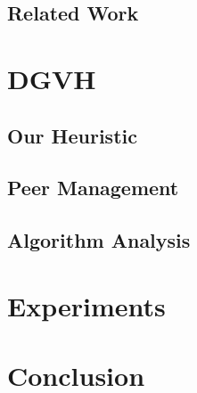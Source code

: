 \documentclass[8pt]{beamer}
\begin{document}
	
	
	\subsection{Related Work}
	
	\section{DGVH}
	
	\subsection{Our Heuristic}
	
	\subsection{Peer Management}
	
	
	\subsection{Algorithm Analysis}
	
	
	\section{Experiments}
	
	
	
	\section{Conclusion}
	
	
	
	\begin{frame}
		\frametitle{}
	\end{frame}
	
\end{document}
